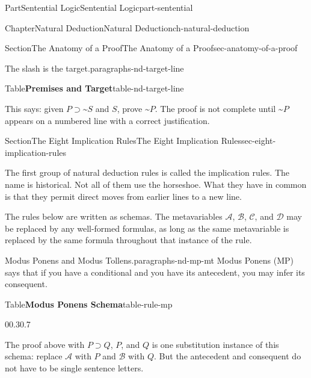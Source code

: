 \documentclass[oneside,10pt,]{book}
\newcommand{\tabularfont}{\relax}
\newcommand{\terminology}[1]{\textbf{#1}}
\newcommand{\hrulemedium}{\noalign{\hrule height 0.07em}}
\renewcommand{\terminology}[1]{#1}
\begin{document}
\begin{partptx}{Part}{Sentential Logic}{}{Sentential Logic}{}{}{part-sentential}
\begin{chapterptx}{Chapter}{Natural Deduction}{}{Natural Deduction}{}{}{ch-natural-deduction}
\begin{sectionptx}{Section}{The Anatomy of a Proof}{}{The Anatomy of a Proof}{}{}{sec-anatomy-of-a-proof}
\begin{paragraphs}{The slash is the target.}{paragraphs-nd-target-line}
\begin{tableptx}{Table}{\textbf{Premises and Target}}{table-nd-target-line}{}
\end{tableptx}%
This says: given \(P \supset {\text{\textasciitilde}}S\) and \(S\), prove \({\text{\textasciitilde}}P\). The proof is not complete until \({\text{\textasciitilde}}P\) appears on a numbered line with a correct justification.%
\end{paragraphs}%
\end{sectionptx}
%
%
\typeout{************************************************}
\typeout{************************************************}
%
\begin{sectionptx}{Section}{The Eight Implication Rules}{}{The Eight Implication Rules}{}{}{sec-eight-implication-rules}
\begin{introduction}{}%
The first group of natural deduction rules is called the implication rules. The name is historical. Not all of them use the horseshoe. What they have in common is that they permit direct moves from earlier lines to a new line.%
\par
The rules below are written as schemas. The metavariables \(\mathcal{A}\), \(\mathcal{B}\), \(\mathcal{C}\), and \(\mathcal{D}\) may be replaced by any well-formed formulas, as long as the same metavariable is replaced by the same formula throughout that instance of the rule.%
\end{introduction}%
\begin{paragraphs}{Modus Ponens and Modus Tollens.}{paragraphs-nd-mp-mt}%
\terminology{Modus Ponens} (MP) says that if you have a conditional and you have its antecedent, you may infer its consequent.%
\begin{tableptx}{Table}{\textbf{Modus Ponens Schema}}{table-rule-mp}{}%
\begin{tabularbox}{0}{0.3}{0.7}%
\resizebox{\ifdim\width > \linewidth\linewidth\else\width\fi}{!}{%
{\tabularfont%
\begin{tabular}{c}
\(\mathcal{A} \supset \mathcal{B}\)\tabularnewline[0pt]
\(\mathcal{A}\)\tabularnewline\hrulemedium
\(\mathcal{B}\)
\end{tabular}
}%
}%
\end{tabularbox}%
\end{tableptx}%
The proof above with \(P \supset Q\), \(P\), and \(Q\) is one \terminology{substitution instance} of this schema: replace \(\mathcal{A}\) with \(P\) and \(\mathcal{B}\) with \(Q\). But the antecedent and consequent do not have to be single sentence letters.%

\end{paragraphs}
\end{sectionptx}
\end{chapterptx}
\end{partptx}
\end{document}
